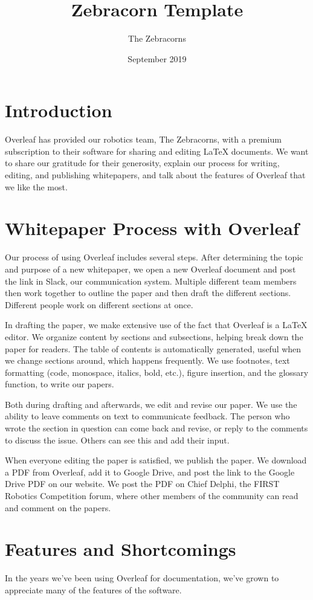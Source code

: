 \documentclass{zebracorns}
\title{Zebracorn Template}
\author{The Zebracorns}
\date{September 2019}
\begin{document}
\maketitle

\section{Introduction}
Overleaf has provided our robotics team, The Zebracorns, with a premium subscription to their software for sharing and editing LaTeX documents. We want to share our gratitude for their generosity, explain our process for writing, editing, and publishing whitepapers, and talk about the features of Overleaf that we like the most.

\section{Whitepaper Process with Overleaf}
Our process of using Overleaf includes several steps. After determining the topic and purpose of a new whitepaper, we open a new Overleaf document and post the link in Slack, our communication system. Multiple different team members then work together to outline the paper and then draft the different sections. Different people work on different sections at once.

In drafting the paper, we make extensive use of the fact that Overleaf is a LaTeX editor. We organize content by sections and subsections, helping break down the paper for readers. The table of contents is automatically generated, useful when we change sections around, which happens frequently. We use footnotes, text formatting (code, monospace, italics, bold, etc.), figure insertion, and the glossary function, to write our papers.

Both during drafting and afterwards, we edit and revise our paper. We use the ability to leave comments on text to communicate feedback. The person who wrote the section in question can come back and revise, or reply to the comments to discuss the issue. Others can see this and add their input.

When everyone editing the paper is satisfied, we publish the paper. We download a PDF from Overleaf, add it to Google Drive, and post the link to the Google Drive PDF on our website. We post the PDF on Chief Delphi, the FIRST Robotics Competition forum, where other members of the community can read and comment on the papers.

\section{Features and Shortcomings}
In the years we've been using Overleaf for documentation, we've grown to appreciate many of the features of the software. 
\end{document}
